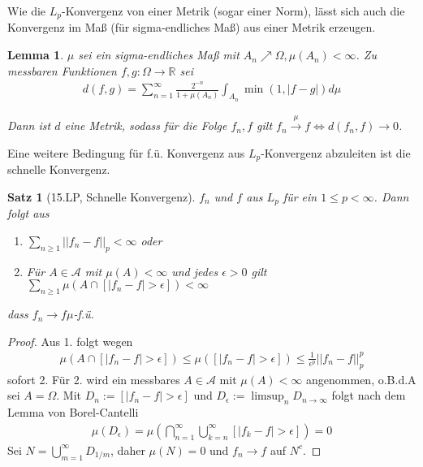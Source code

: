 \documentclass[]{article}
\newtheorem{theorem}{Satz}
\newtheorem{lemma}{Lemma}
\begin{document}
Wie die $L_p$-Konvergenz von einer Metrik (sogar einer Norm), lässt sich auch die Konvergenz im Maß (für sigma-endliches Maß) aus einer Metrik erzeugen.

\begin{lemma}
	$\mu$ sei ein sigma-endliches Maß mit $A_n \nearrow \Omega, \mu(A_n) < \infty$. Zu messbaren Funktionen $f,g : \Omega \rightarrow \mathbb{R}$ sei
	\begin{align*}
		d(f,g) = \sum_{n=1}^{\infty} \frac{2^{-n}}{1+\mu(A_n)} \int_{A_n} \min (1, |f-g|) d\mu
	\end{align*}

	Dann ist $d$ eine Metrik, sodass für die Folge $f_n, f$ gilt $f_n \xrightarrow{\mu} f \iff d(f_n, f) \rightarrow 0$.
\end{lemma}

Eine weitere Bedingung für f.ü. Konvergenz aus $L_p$-Konvergenz abzuleiten ist die schnelle Konvergenz.

\begin{theorem}[15.LP, Schnelle Konvergenz]
	$f_n$ und $f$ aus $L_p$ für ein $1 \leq p < \infty$. Dann folgt aus
	\begin{enumerate}
		\item $\sum_{n\geq 1} ||f_n - f||_p < \infty$ oder
		\item Für $A \in \mathcal{A}$ mit $\mu(A) < \infty$ und jedes $\epsilon > 0$ gilt $\sum_{n\geq 1} \mu(A \cap [|f_n-f| > \epsilon]) < \infty$
	\end{enumerate}
	dass $f_n \rightarrow f \mu$-f.ü.
\end{theorem}

\begin{proof}
	Aus 1. folgt wegen
	\begin{align*}
		\mu(A \cap [|f_n - f| > \epsilon]) \leq \mu([|f_n - f| > \epsilon]) \leq \frac{1}{\epsilon^p} ||f_n - f||^p_p
	\end{align*}
	sofort 2. Für 2. wird ein messbares $A \in \mathcal{A}$ mit $\mu(A) < \infty$ angenommen, o.B.d.A sei $A = \Omega$. Mit $D_n := [|f_n - f| > \epsilon]$ und $D_\epsilon := \limsup_{n}D_{n\rightarrow\infty}$ folgt nach dem Lemma von Borel-Cantelli
	\begin{align*}
		\mu(D_\epsilon) = \mu(\bigcap_{n=1}^{\infty} \bigcup_{k=n}^{\infty}[|f_k - f| > \epsilon]) = 0
	\end{align*}
	Sei $N = \bigcup_{m=1}^\infty D_{1/m}$, daher $\mu(N) = 0$ und $f_n \rightarrow f$ auf $N^c$.
\end{proof}
\end{document}
